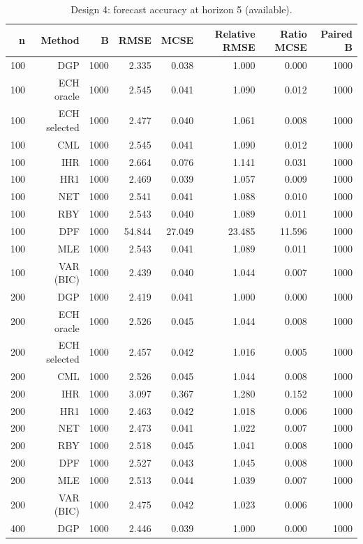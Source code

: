 \begin{table}[p]\centering
\caption{Design 4: forecast accuracy at horizon 5 (available).}
\small
\begin{tabular}{rrrrrrrr}\toprule
n & Method & B & RMSE & MCSE & Relative RMSE & Ratio MCSE & Paired B \\\midrule
100 & DGP & 1000 & 2.335 & 0.038 & 1.000 & 0.000 & 1000 \\
100 & ECH oracle & 1000 & 2.545 & 0.041 & 1.090 & 0.012 & 1000 \\
100 & ECH selected & 1000 & 2.477 & 0.040 & 1.061 & 0.008 & 1000 \\
100 & CML & 1000 & 2.545 & 0.041 & 1.090 & 0.012 & 1000 \\
100 & IHR & 1000 & 2.664 & 0.076 & 1.141 & 0.031 & 1000 \\
100 & HR1 & 1000 & 2.469 & 0.039 & 1.057 & 0.009 & 1000 \\
100 & NET & 1000 & 2.541 & 0.041 & 1.088 & 0.010 & 1000 \\
100 & RBY & 1000 & 2.543 & 0.040 & 1.089 & 0.011 & 1000 \\
100 & DPF & 1000 & 54.844 & 27.049 & 23.485 & 11.596 & 1000 \\
100 & MLE & 1000 & 2.543 & 0.041 & 1.089 & 0.011 & 1000 \\
100 & VAR (BIC) & 1000 & 2.439 & 0.040 & 1.044 & 0.007 & 1000 \\
200 & DGP & 1000 & 2.419 & 0.041 & 1.000 & 0.000 & 1000 \\
200 & ECH oracle & 1000 & 2.526 & 0.045 & 1.044 & 0.008 & 1000 \\
200 & ECH selected & 1000 & 2.457 & 0.042 & 1.016 & 0.005 & 1000 \\
200 & CML & 1000 & 2.526 & 0.045 & 1.044 & 0.008 & 1000 \\
200 & IHR & 1000 & 3.097 & 0.367 & 1.280 & 0.152 & 1000 \\
200 & HR1 & 1000 & 2.463 & 0.042 & 1.018 & 0.006 & 1000 \\
200 & NET & 1000 & 2.473 & 0.041 & 1.022 & 0.007 & 1000 \\
200 & RBY & 1000 & 2.518 & 0.045 & 1.041 & 0.008 & 1000 \\
200 & DPF & 1000 & 2.527 & 0.043 & 1.045 & 0.008 & 1000 \\
200 & MLE & 1000 & 2.513 & 0.044 & 1.039 & 0.007 & 1000 \\
200 & VAR (BIC) & 1000 & 2.475 & 0.042 & 1.023 & 0.006 & 1000 \\
400 & DGP & 1000 & 2.446 & 0.039 & 1.000 & 0.000 & 1000 \\

\end{tabular}
\end{table}

